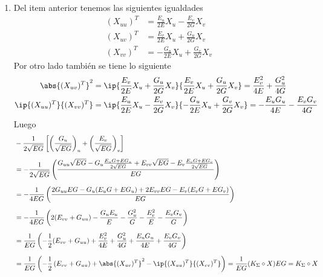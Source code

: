 \documentclass{article}
\begin{document}
\begin{enumerate}
    \item Del item anterior tenemos las siguientes igualdades
    \begin{align*}
        (X_{uu})^{T} &= \frac{E_{u}}{2E}X_{u}-\frac{E_{v}}{2G}X_{v} \\
        (X_{uv})^{T} &= \frac{E_{v}}{2E}X_{u}+\frac{G_{u}}{2G}X_{v} \\
        (X_{vv})^{T} &= -\frac{G_{u}}{2E}X_{u}+\frac{G_{v}}{2G}X_{v}
    \end{align*}
    Por otro lado también se tiene lo siguiente
    \begin{align*}
        \abs{(X_{uv})^{T}}^{2} &= \ip{\frac{E_{v}}{2E}X_{u}+\frac{G_{u}}{2G}X_{v}}
        {\frac{E_{v}}{2E}X_{u}+\frac{G_{u}}{2G}X_{v}}=\frac{E_{v}^{2}}{4E}+\frac{G_{u}^{2}}{4G} \\
        \ip{(X_{uu})^{T}}{(X_{vv})^{T}} &= \ip{\frac{E_{u}}{2E}X_{u}-\frac{E_{v}}{2G}X_{v}}
        {-\frac{G_{u}}{2E}X_{u}+\frac{G_{v}}{2G}X_{v}}=-\frac{E_{u}G_{u}}{4E}-\frac{E_{v}G_{v}}{4G}
    \end{align*}
    Luego
    \begin{align*}
        &-\frac{1}{2\sqrt{EG}}\left[\left(\frac{G_{u}}{\sqrt{EG}}\right)_{u}+\left(\frac{E_{v}}
        {\sqrt{EG}}\right)_{v}\right] \\[2mm]
        &= -\frac{1}{2\sqrt{EG}}\left(\frac{G_{uu}\sqrt{EG}-G_{u}
        \frac{E_{u}G+EG_{u}}{2\sqrt{EG}}+E_{vv}\sqrt{EG}-E_{v}\frac{E_{v}G+EG_{v}}{2\sqrt{EG}}}{EG}
        \right) \\[2mm]
        &= -\frac{1}{4EG}\left(\frac{2G_{uu}EG-G_{u}(E_{u}G+EG_{u})+2E_{vv}EG-E_{v}
        (E_{v}G+EG_{v})}{EG}\right) \\[2mm]
        &= -\frac{1}{4EG}\left(2(E_{vv}+G_{uu})-\frac{G_{u}E_{u}}{E}-\frac{G_{u}^{2}}{G}
        -\frac{E_{v}^{2}}{E}-\frac{E_{v}G_{v}}{G}\right) \\[2mm]
        &= \frac{1}{EG}\left(-\frac{1}{2}(E_{vv}+G_{uu})+\frac{E_{v}^{2}}{4E}+\frac{G_{u}^{2}}{4G}
        +\frac{E_{u}G_{u}}{4E}+\frac{E_{v}G_{v}}{4G}\right) \\[2mm]
        &=\frac{1}{EG}\left(-\frac{1}{2}\left(E_{vv}+G_{uu}\right)+\abs{(X_{uv})^{T}}^{2}
        -\ip{(X_{uu})^{T}}{(X_{vv})^{T}}\right)=\frac{1}{EG}(K_{\Sigma}\circ X)EG=K_{\Sigma}\circ X
    \end{align*}    
\end{enumerate}
\end{document}
